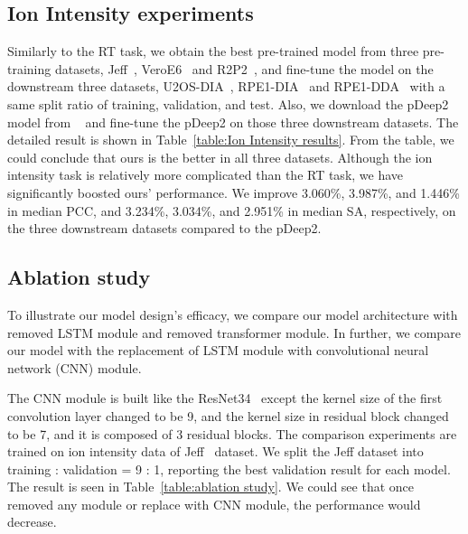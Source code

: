 \subsection{Ion Intensity experiments}
Similarly to the RT task, we obtain the best pre-trained model from three pre-training datasets, Jeff~\cite{liu2018vivo}, VeroE6~\cite{bouhaddou2020global} and R2P2~\cite{leutert2019r2}, and fine-tune the model on the downstream three datasets, U2OS-DIA~\cite{wang2020naguider}, RPE1-DIA~\cite{bekker2020rapid} and RPE1-DDA~\cite{bekker2020rapid} with a same split ratio of training, validation, and test. Also, we download the pDeep2 model from ~\cite{zeng2019ms} and fine-tune the pDeep2 on those three downstream datasets. The detailed result is shown in Table~\ref{table:Ion Intensity results}. From the table, we could conclude that ours is the better in all three datasets. Although the ion intensity task is relatively more complicated than the RT task, we have significantly boosted ours' performance. We improve 3.060\%, 3.987\%, and 1.446\% in median PCC, and 3.234\%, 3.034\%, and 2.951\% in median SA, respectively, on the three downstream datasets compared to the pDeep2.

\subsection{Ablation study}
To illustrate our model design's efficacy, we compare our model architecture with removed LSTM module and removed transformer module. In further, we compare our model with the replacement of LSTM module with convolutional neural network (CNN) module.

The CNN module is built like the ResNet34~\cite{he2015deep} except the kernel size of the first convolution layer changed to be 9, and the kernel size in residual block changed to be 7, and it is composed of 3 residual blocks.
The comparison experiments are trained on ion intensity data of Jeff~\cite{liu2018vivo} dataset. We split the Jeff dataset into training : validation = 9 : 1, reporting the best validation result for each model. The result is seen in Table~\ref{table:ablation study}. We could see that once removed any module or replace with CNN module, the performance would decrease. 
